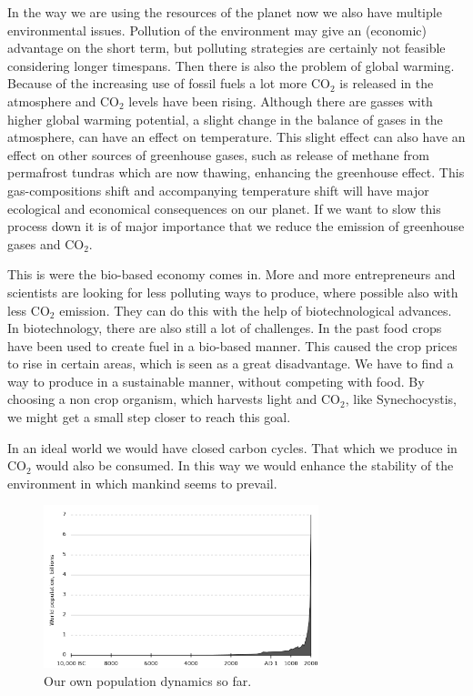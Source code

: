 \documentclass[12pt]{report}
\begin{document}
In the way we are using the resources of the planet now we also have multiple 
environmental issues. Pollution of the environment may give an (economic) 
advantage on the short term, but polluting strategies are certainly not feasible 
considering longer timespans. 
Then there is also the problem of global warming. Because of the increasing use 
of fossil fuels a lot more CO$_{2}$ is released in the atmosphere and CO$_{2}$ 
levels have been rising. Although there are gasses with higher global warming 
potential, a slight change in the balance of gases in the atmosphere, can have 
an effect on temperature. This slight effect can also have an effect on other 
sources of greenhouse gases, such as release of methane from permafrost tundras 
which are now thawing, enhancing the greenhouse effect. This gas-compositions 
shift and accompanying temperature shift will have major ecological and 
economical consequences on our planet. If we want to slow this process down it 
is of major importance that we reduce the emission of greenhouse gases and 
CO$_2$.

This is were the bio-based economy comes in. More and more entrepreneurs and 
scientists are looking for less polluting ways to produce, where possible also 
with less CO$_2$ emission. They can do this with the help of biotechnological 
advances. In biotechnology, there are also still a lot of challenges. In the 
past food crops have been used to create fuel in a bio-based manner. This caused 
the crop prices to rise in certain areas, which is seen as a great disadvantage. 
We have to find a way to produce in a sustainable manner, without competing with 
food. By choosing a non crop organism, which harvests light and CO$_2$, like 
Synechocystis, we might get a small step closer to reach this goal. 

In an ideal world we would have closed carbon cycles. That which we produce in 
CO$_2$ would also be consumed. In this way we would enhance the stability of the 
environment in which mankind seems to prevail. 

\begin{figure}[!ht]
 \begin{center}  
  \includegraphics[width=8cm]{human_population_curve.png}
  \caption{Our own population dynamics so far.}
  \label{fig:owndyn}
 \end{center}
\end{figure}
\end{document}
